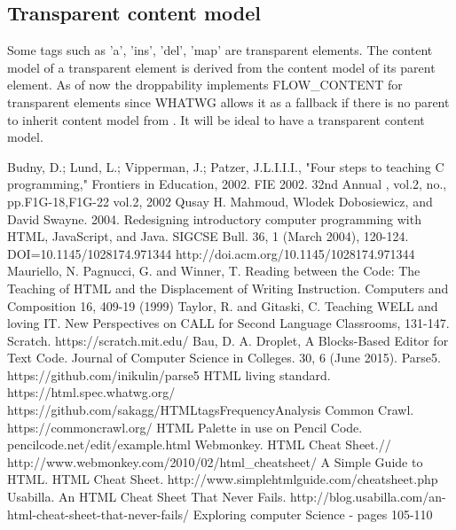 \documentclass[conference]{IEEEtran}
\begin{document}
\subsection{Transparent content model}
Some tags such as 'a', 'ins', 'del', 'map' are transparent elements. The content model of a transparent element is derived from the content model of its parent element. As of now the droppability implements FLOW\_CONTENT \cite{flowcontent} for transparent elements since WHATWG allows it as a fallback if there is no parent to inherit content model from \cite{whatwgtransparent}. It will be ideal to have a transparent content model.

\begin{thebibliography}{1}

  Budny, D.; Lund, L.; Vipperman, J.; Patzer, J.L.I.I.I., "Four steps to teaching C programming," Frontiers in Education, 2002. FIE 2002. 32nd Annual , vol.2, no., pp.F1G-18,F1G-22 vol.2, 2002
  Qusay H. Mahmoud, Wlodek Dobosiewicz, and David Swayne. 2004. Redesigning introductory computer programming with HTML, JavaScript, and Java. SIGCSE Bull. 36, 1 (March 2004), 120-124. DOI=10.1145/1028174.971344 http://doi.acm.org/10.1145/1028174.971344
  Mauriello, N. Pagnucci, G. and Winner, T. Reading between the Code: The Teaching of HTML and the Displacement of Writing Instruction. Computers and Composition 16, 409-19 (1999)
  Taylor, R. and Gitaski, C. Teaching WELL and loving IT. New Perspectives on CALL for Second Language Classrooms, 131-147.
  Scratch. https://scratch.mit.edu/
  Bau, D. A. Droplet, A Blocks-Based Editor for Text Code. Journal of Computer Science in Colleges. 30, 6 (June 2015).
  Parse5. https://github.com/inikulin/parse5
  HTML living standard. https://html.spec.whatwg.org/
  https://github.com/sakagg/HTMLtagsFrequencyAnalysis
  Common Crawl. https://commoncrawl.org/
  HTML Palette in use on Pencil Code. pencilcode.net/edit/example.html
  Webmonkey. HTML Cheat Sheet.// http://www.webmonkey.com/2010/02/html\_cheatsheet/
  A Simple Guide to HTML. HTML Cheat Sheet. http://www.simplehtmlguide.com/cheatsheet.php
  Usabilla. An HTML Cheat Sheet That Never Fails. http://blog.usabilla.com/an-html-cheat-sheet-that-never-fails/
  Exploring computer Science - pages 105-110\\

\end{thebibliography}
\end{document}
